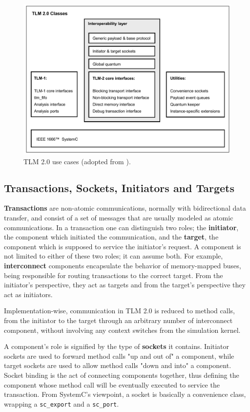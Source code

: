 \documentclass[12pt,twoside]{article}
\begin{document}
\begin{figure}[H]
\centering
\includegraphics[scale=.3]{Figures/TLM_features.png}
\caption{\label{fig:TLM_features}TLM 2.0 use cases (adopted from \cite{OpenSystemCInitiative2009}).}
\end{figure}


\subsection{Transactions, Sockets, Initiators and Targets}
\label{sec-6-2}
\textbf{Transactions} are non-atomic communications, normally with bidirectional data transfer, and consist of a set of messages that are usually modeled as atomic communications.
In a transaction one can distinguish two roles;
the \textbf{initiator}, the component which initiated the communication, and the \textbf{target}, the component which is supposed to service the initiator's request.
A component is not limited to either of these two roles; it can assume both.
For example, \textbf{interconnect} components encapsulate the behavior of memory-mapped buses, being responsible for routing transactions to the correct target.
From the initiator's perspective, they act as targets and from the target's perspective they act as initiators.

Implementation-wise, communication in TLM 2.0 is reduced to method calls, 
from the initiator to the target through an arbitrary number of interconnect component, without involving any context switches from the simulation kernel.

A component's role is signified by the type of \textbf{sockets} it contains.
Initiator sockets are used to forward method calls "up and out of" a component, while target sockets are used to allow method calls "down and into" a component.
Socket binding is the act of connecting components together, thus defining the component whose method call will be eventually executed to service the transaction.
From SystemC's viewpoint, a socket is basically a convenience class, wrapping a \texttt{sc\_export} and a \texttt{sc\_port}.
\end{document}
